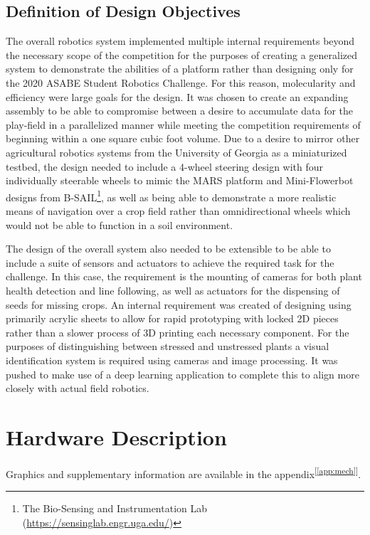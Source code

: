 \documentclass[11pt, hidelinks]{report}
\newcommand{\refapp}[1]{\textsuperscript{[\ref{#1}]}}
\begin{document}
\subsection{Definition of Design Objectives}
The overall robotics system implemented multiple internal requirements beyond the necessary scope of the competition for the purposes of creating a generalized system to demonstrate the abilities of a platform rather than designing only for the 2020 ASABE Student Robotics Challenge. For this reason, molecularity and efficiency were large goals for the design. It was chosen to create an expanding assembly to be able to compromise between a desire to accumulate data for the play-field in a parallelized manner while meeting the competition requirements of beginning within a one square cubic foot volume. Due to a desire to mirror other agricultural robotics systems from the University of Georgia as a miniaturized testbed, the design needed to include a 4-wheel steering design with four individually steerable wheels to mimic the MARS platform and Mini-Flowerbot designs from B-SAIL\footnote{The Bio-Sensing and Instrumentation Lab (\url{https://sensinglab.engr.uga.edu/})}, as well as being able to demonstrate a more realistic means of navigation over a crop field rather than omnidirectional wheels which would not be able to function in a soil environment. 

The design of the overall system also needed to be extensible to be able to include a suite of sensors and actuators to achieve the required task for the challenge. In this case, the requirement is the mounting of cameras for both plant health detection and line following, as well as actuators for the dispensing of seeds for missing crops. An internal requirement was created of designing using primarily acrylic sheets to allow for rapid prototyping with locked 2D pieces rather than a slower process of 3D printing each necessary component. For the purposes of distinguishing between stressed and unstressed plants a visual identification system is required using cameras and image processing. It was pushed to make use of a deep learning application to complete this to align more closely with actual field robotics.

\section{Hardware Description}
Graphics and supplementary information are available in the appendix\refapp{app:mech}. 
\end{document}

